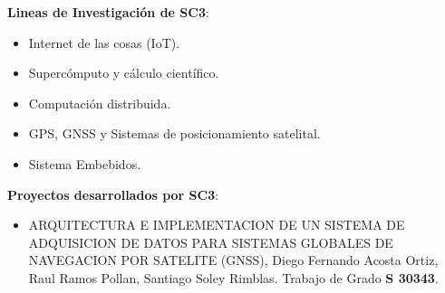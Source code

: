 \textbf{Lineas de Investigación de SC3}:

\begin{itemize}
	\item Internet de las cosas (IoT).
	\item Supercómputo y cálculo científico.
	\item Computación distribuida.
	\item GPS, GNSS y Sistemas de posicionamiento satelital.
	\item Sistema Embebidos.
\end{itemize}

\textbf{Proyectos desarrollados por SC3}:

\begin{itemize}
	\item ARQUITECTURA E IMPLEMENTACION DE UN SISTEMA DE ADQUISICION DE DATOS PARA SISTEMAS GLOBALES DE NAVEGACION POR SATELITE (GNSS), Diego Fernando Acosta Ortiz, Raul Ramos Pollan, Santiago Soley Rimblas. Trabajo de Grado \textbf{S 30343}.
\end{itemize}
